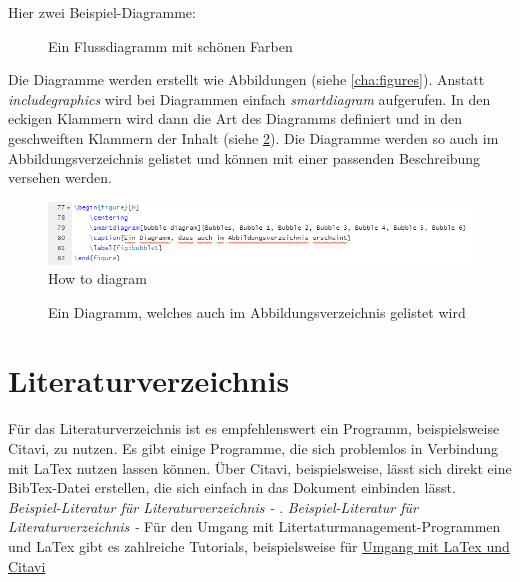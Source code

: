 Hier zwei Beispiel-Diagramme:
\begin{figure}[H]
    \centering
    \caption{Ein Flussdiagramm mit schönen Farben}
    \label{fig:flowdiagram}
\end{figure}

Die Diagramme werden erstellt wie Abbildungen (siehe \ref{cha:figures}). Anstatt \emph{includegraphics} wird bei Diagrammen einfach \emph{smartdiagram} aufgerufen. In den eckigen Klammern wird dann die Art des Diagramms definiert und in den geschweiften Klammern der Inhalt (siehe \ref{fig:diagrams}). Die Diagramme werden so auch im Abbildungsverzeichnis gelistet und können mit einer passenden Beschreibung versehen werden.

\begin{figure}
    \centering
    \includegraphics[width=\textwidth]{03_GraphicFiles/smartdiagram.PNG}
    \caption{How to diagram}
    \label{fig:diagrams}
\end{figure}

\begin{figure}[H]
    \centering
    \caption{Ein Diagramm, welches auch im Abbildungsverzeichnis gelistet wird}
    \label{fig:bubble1}
\end{figure}

\section{Literaturverzeichnis}
Für das Literaturverzeichnis ist es empfehlenswert ein Programm, beispielsweise Citavi, zu nutzen. Es gibt einige Programme, die sich problemlos in Verbindung mit LaTex nutzen lassen können. Über Citavi, beispielsweise, lässt sich direkt eine BibTex-Datei erstellen, die sich einfach in das Dokument einbinden lässt. \emph{Beispiel-Literatur für Literaturverzeichnis -} \cite{Butterworth1992}.
\emph{Beispiel-Literatur für Literaturverzeichnis -} \cite{Clark1976}
Für den Umgang mit Litertaturmanagement-Programmen und LaTex gibt es zahlreiche Tutorials, beispielsweise für  \href{https://www.youtube.com/watch?v=GmyCcvXrSDI}{Umgang mit LaTex und Citavi}




